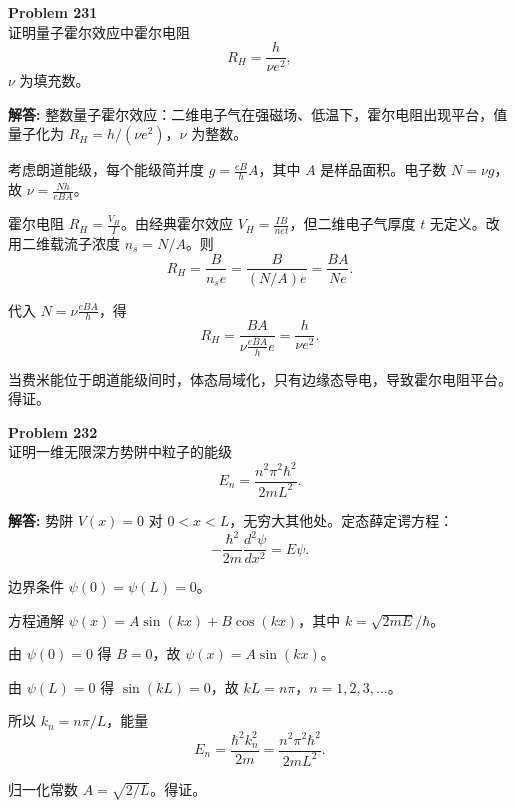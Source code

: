 \documentclass[12pt, a4paper, oneside]{ctexart}
\newenvironment{solution}{\par\noindent\textbf{解答:}\quad}{\par}
\begin{document}
\begin{mdframed}[backgroundcolor=gray!10, linewidth=0pt]
    \textbf{Problem 231} \\
    证明量子霍尔效应中霍尔电阻
    \[
    R_H = \frac{h}{\nu e^2},
    \]
    $\nu$ 为填充数。
\end{mdframed}
\begin{solution}
    整数量子霍尔效应：二维电子气在强磁场、低温下，霍尔电阻出现平台，值量子化为 $R_H = h/(\nu e^2)$，$\nu$ 为整数。
    
    考虑朗道能级，每个能级简并度 $g = \frac{e B}{h} A$，其中 $A$ 是样品面积。电子数 $N = \nu g$，故 $\nu = \frac{N h}{e B A}$。
    
    霍尔电阻 $R_H = \frac{V_H}{I}$。由经典霍尔效应 $V_H = \frac{I B}{n e t}$，但二维电子气厚度 $t$ 无定义。改用二维载流子浓度 $n_s = N/A$。则
    \[
    R_H = \frac{B}{n_s e} = \frac{B}{(N/A) e} = \frac{B A}{N e}.
    \]
    
    代入 $N = \nu \frac{e B A}{h}$，得
    \[
    R_H = \frac{B A}{\nu \frac{e B A}{h} e} = \frac{h}{\nu e^2}.
    \]
    
    当费米能位于朗道能级间时，体态局域化，只有边缘态导电，导致霍尔电阻平台。得证。
\end{solution}

\begin{mdframed}[backgroundcolor=gray!10, linewidth=0pt]
    \textbf{Problem 232} \\
    证明一维无限深方势阱中粒子的能级
    \[
    E_n = \frac{n^2 \pi^2 \hbar^2}{2 m L^2}.
    \]
\end{mdframed}
\begin{solution}
    势阱 $V(x) = 0$ 对 $0 < x < L$，无穷大其他处。定态薛定谔方程：
    \[
    -\frac{\hbar^2}{2m} \frac{d^2 \psi}{dx^2} = E \psi.
    \]
    
    边界条件 $\psi(0) = \psi(L) = 0$。
    
    方程通解 $\psi(x) = A \sin(kx) + B \cos(kx)$，其中 $k = \sqrt{2mE}/\hbar$。
    
    由 $\psi(0)=0$ 得 $B=0$，故 $\psi(x) = A \sin(kx)$。
    
    由 $\psi(L)=0$ 得 $\sin(kL)=0$，故 $kL = n\pi$，$n=1,2,3,\dots$。
    
    所以 $k_n = n\pi/L$，能量
    \[
    E_n = \frac{\hbar^2 k_n^2}{2m} = \frac{n^2 \pi^2 \hbar^2}{2 m L^2}.
    \]
    
    归一化常数 $A = \sqrt{2/L}$。得证。
\end{solution}
\end{document}
